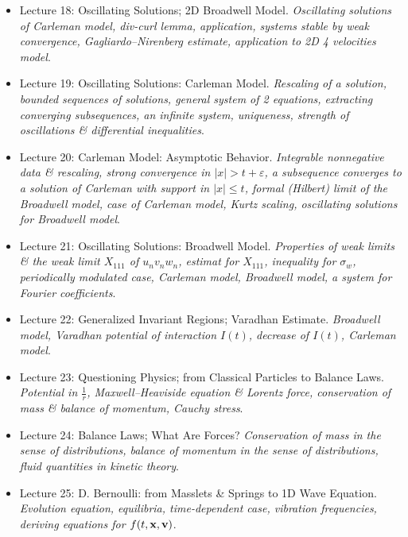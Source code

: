 \documentclass{article}
\begin{document}
\begin{enumerate}
\begin{itemize}
		\item {\sf Lecture 18: Oscillating Solutions; 2D Broadwell Model.} {\it Oscillating solutions of Carleman model, div-curl lemma, application, systems stable by weak convergence, Gagliardo--Nirenberg estimate, application to 2D 4 velocities model}.
		
		\item {\sf Lecture 19: Oscillating Solutions: Carleman Model.} {\it Rescaling of a solution, bounded sequences of solutions, general system of 2 equations, extracting converging subsequences, an infinite system, uniqueness, strength of oscillations \& differential inequalities}.
		
		\item {\sf Lecture 20: Carleman Model: Asymptotic Behavior.} {\it Integrable nonnegative data \& rescaling, strong convergence in $|x| > t + \varepsilon$, a subsequence converges to a solution of Carleman with support in $|x|\le t$, formal (Hilbert) limit of the Broadwell model, case of Carleman model, Kurtz scaling, oscillating solutions for Broadwell model}.
		
		\item {\sf Lecture 21: Oscillating Solutions: Broadwell Model.} {\it Properties of weak limits \& the weak limit $X_{111}$ of $u_nv_nw_n$, estimat for $X_{111}$, inequality for $\sigma_w$, periodically modulated case, Carleman model, Broadwell model, a system for Fourier coefficients}.
		
		\item {\sf Lecture 22: Generalized Invariant Regions; Varadhan Estimate.} {\it Broadwell model, Varadhan potential of interaction $I(t)$, decrease of $I(t)$, Carleman model}.
		
		\item {\sf Lecture 23: Questioning Physics; from Classical Particles to Balance Laws.} {\it Potential in $\frac{1}{r}$, Maxwell--Heaviside equation \& Lorentz force, conservation of mass \& balance of momentum, Cauchy stress}.
		
		\item {\sf Lecture 24: Balance Laws; What Are Forces?} {\it Conservation of mass in the sense of distributions, balance of momentum in the sense of distributions, fluid quantities in kinetic theory}.
		
		\item {\sf Lecture 25: D. Bernoulli: from Masslets \& Springs to 1D Wave Equation.} {\it Evolution equation, equilibria, time-dependent case, vibration frequencies, deriving equations for $f(t,{\bf x},{\bf v})$}.
		

\end{itemize}
\end{enumerate}
\end{document}
